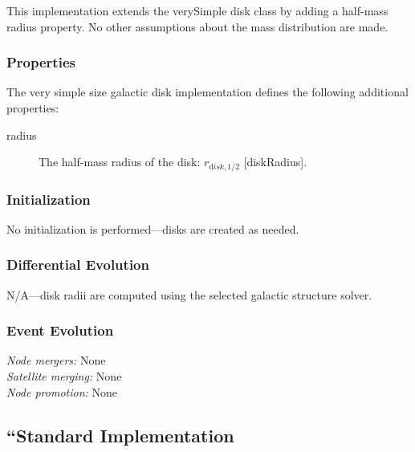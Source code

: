 This implementation extends the {\normalfont \ttfamily verySimple} disk class by adding a half-mass radius property. No other assumptions about the mass distribution are made.

\subsubsection{Properties}

The very simple size galactic disk implementation defines the following additional properties:
\begin{description}
 \item [{\normalfont \ttfamily radius}] The half-mass radius of the disk: $r_{\mathrm disk, 1/2}$ [{\normalfont \ttfamily diskRadius}].
\end{description}

\subsubsection{Initialization}

No initialization is performed---disks are created as needed.

\subsubsection{Differential Evolution}

N/A---disk radii are computed using the selected galactic structure solver.

\subsubsection{Event Evolution}

\noindent\emph{Node mergers:} None\\

\noindent\emph{Satellite merging:} None\\

\noindent\emph{Node promotion:} None\\

\subsection{``Standard Implementation}\label{sec:DiskStandard}

